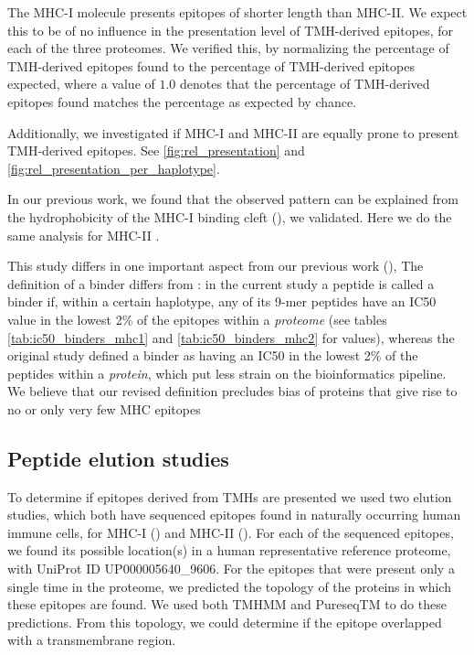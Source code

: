 The MHC-I molecule presents epitopes of shorter length than MHC-II.
We expect this to be of no influence in the presentation level
of TMH-derived epitopes, for each of the three proteomes.
We verified this, by normalizing the percentage of TMH-derived epitopes found
to the percentage of TMH-derived epitopes expected, 
where a value of $1.0$ denotes that the percentage of TMH-derived epitopes found
matches the percentage as expected by chance.

Additionally, we investigated if MHC-I and MHC-II are equally prone
to present TMH-derived epitopes. 
See \ref{fig:rel_presentation} and \ref{fig:rel_presentation_per_haplotype}.

In our previous work, we found that the observed pattern can be
explained from the hydrophobicity of the MHC-I binding 
cleft (\cite{bianchi2017}), we validated.
Here we do the same analysis for MHC-II .

This study differs in one important aspect from our previous work (\cite{bianchi2017}), 
The definition of a binder differs from \cite{bianchi2017}:
in the current study a peptide is called a binder if, within a certain haplotype, 
any of its 9-mer peptides have an IC50 value in the lowest 2\% of 
the epitopes within a 
\emph{proteome} (see tables \ref{tab:ic50_binders_mhc1} and \ref{tab:ic50_binders_mhc2}
for values), whereas the original study defined
a binder as having an IC50 in the lowest 2\% 
of the peptides within a \emph{protein}, 
which put less strain on the bioinformatics pipeline.
We believe that our revised definition precludes bias of proteins 
that give rise to no or only very few MHC epitopes

\subsection{Peptide elution studies}\label{subsec:elution_studies}

To determine if epitopes derived from TMHs are presented 
we used two elution studies, which both have sequenced
epitopes found in naturally occurring human immune cells,
for MHC-I (\cite{schellens2015comprehensive}) 
and MHC-II (\cite{bergseng2015different}).
For each of the sequenced epitopes,
we found its possible location(s) in 
a human representative reference proteome,
with UniProt ID UP000005640\_9606.
For the epitopes that were present only a single time in the proteome,
we predicted the topology of the proteins in which these epitopes are found.
We used both TMHMM and PureseqTM to do these predictions. 
From this topology, we could determine if the epitope
overlapped with a transmembrane region.


